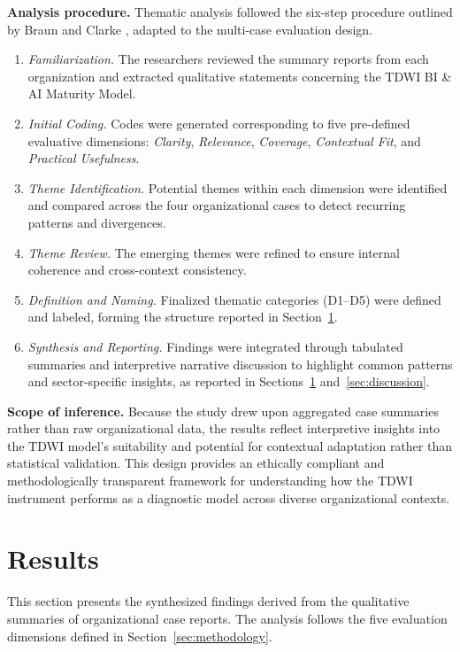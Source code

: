 \documentclass[conference]{IEEEtran}
\begin{document}
\textbf{Analysis procedure.}  
Thematic analysis followed the six-step procedure outlined by Braun and Clarke \cite{braun2006using}, adapted to the multi-case evaluation design.  
\begin{enumerate}[]
    \item \textit{Familiarization.} The researchers reviewed the summary reports from each organization and extracted qualitative statements concerning the TDWI BI \& AI Maturity Model.
    \item \textit{Initial Coding.} Codes were generated corresponding to five pre-defined evaluative dimensions: \textit{Clarity}, \textit{Relevance}, \textit{Coverage}, \textit{Contextual Fit}, and \textit{Practical Usefulness}.
    \item \textit{Theme Identification.} Potential themes within each dimension were identified and compared across the four organizational cases to detect recurring patterns and divergences.
    \item \textit{Theme Review.} The emerging themes were refined to ensure internal coherence and cross-context consistency.
    \item \textit{Definition and Naming.} Finalized thematic categories (D1–D5) were defined and labeled, forming the structure reported in Section~\ref{sec:results}.
    \item \textit{Synthesis and Reporting.} Findings were integrated through tabulated summaries and interpretive narrative discussion to highlight common patterns and sector-specific insights, as reported in Sections~\ref{sec:results} and~\ref{sec:discussion}.
\end{enumerate}

\textbf{Scope of inference.}  
Because the study drew upon aggregated case summaries rather than raw organizational data, the results reflect interpretive insights into the TDWI model’s suitability and potential for contextual adaptation rather than statistical validation. This design provides an ethically compliant and methodologically transparent framework for understanding how the TDWI instrument performs as a diagnostic model across diverse organizational contexts.


\section{Results}
\label{sec:results}

This section presents the synthesized findings derived from the qualitative summaries of organizational case reports. 
The analysis follows the five evaluation dimensions defined in Section~\ref{sec:methodology}.
\end{document}
